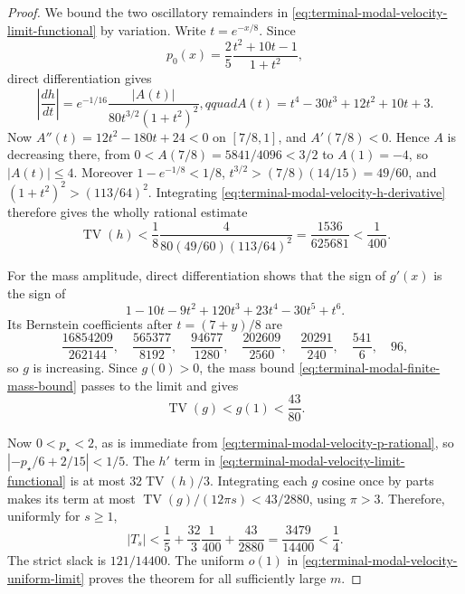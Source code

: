 \begin{proof}
We bound the two oscillatory remainders in
\eqref{eq:terminal-modal-velocity-limit-functional} by variation.  Write
$t=e^{-x/8}$.  Since
\begin{equation}
 p_0(x)=\frac25\frac{t^2+10t-1}{1+t^2},
 \label{eq:terminal-modal-velocity-p-rational}
\end{equation}
direct differentiation gives
\begin{equation}
 \left|\frac{dh}{dt}\right|
 =e^{-1/16}\frac{|A(t)|}{80t^{3/2}(1+t^2)^2},qquad
 A(t)=t^4-30t^3+12t^2+10t+3.
 \label{eq:terminal-modal-velocity-h-derivative}
\end{equation}
Now $A''(t)=12t^2-180t+24<0$ on $[7/8,1]$, and
$A'(7/8)<0$.  Hence $A$ is decreasing there, from
$0<A(7/8)=5841/4096<3/2$ to $A(1)=-4$, so $|A(t)|\le4$.  Moreover
$1-e^{-1/8}<1/8$, $t^{3/2}>(7/8)(14/15)=49/60$, and
$(1+t^2)^2>(113/64)^2$.  Integrating
\eqref{eq:terminal-modal-velocity-h-derivative} therefore gives the wholly
rational estimate
\begin{equation}
 \operatorname{TV}(h)
 <\frac18\frac4{80(49/60)(113/64)^2}
 =\frac{1536}{625681}<\frac1{400}.
 \label{eq:terminal-modal-velocity-h-TV}
\end{equation}

For the mass amplitude, direct differentiation shows that the sign of
$g'(x)$ is the sign of
\begin{equation}
 1-10t-9t^2+120t^3+23t^4-30t^5+t^6.
 \label{eq:terminal-modal-velocity-g-sign}
\end{equation}
Its Bernstein coefficients after $t=(7+y)/8$ are
\begin{equation}
 \frac{16854209}{262144},\quad
 \frac{565377}{8192},\quad
 \frac{94677}{1280},\quad
 \frac{202609}{2560},\quad
 \frac{20291}{240},\quad
 \frac{541}{6},\quad96,
 \label{eq:terminal-modal-velocity-g-Bernstein}
\end{equation}
so $g$ is increasing.  Since $g(0)>0$, the mass bound
\eqref{eq:terminal-modal-finite-mass-bound} passes to the limit and gives
\begin{equation}
 \operatorname{TV}(g)<g(1)<\frac{43}{80}.
 \label{eq:terminal-modal-velocity-g-TV}
\end{equation}

Now $0<p_\star<2$, as is immediate from
\eqref{eq:terminal-modal-velocity-p-rational}, so
$|-p_\star/6+2/15|<1/5$.  The $h'$ term in
\eqref{eq:terminal-modal-velocity-limit-functional} is at most
$32\operatorname{TV}(h)/3$.  Integrating each $g$ cosine once by parts makes
its term at most $\operatorname{TV}(g)/(12\pi s)<43/2880$, using $\pi>3$.
Therefore, uniformly for $s\ge1$,
\begin{equation}
 |T_s|<\frac15+\frac{32}{3}\frac1{400}
 +\frac{43}{2880}
 =\frac{3479}{14400}<\frac14.
 \label{eq:terminal-modal-velocity-final-ledger}
\end{equation}
The strict slack is $121/14400$.  The uniform $o(1)$ in
\eqref{eq:terminal-modal-velocity-uniform-limit} proves the theorem for all
sufficiently large $m$.
\end{proof}
